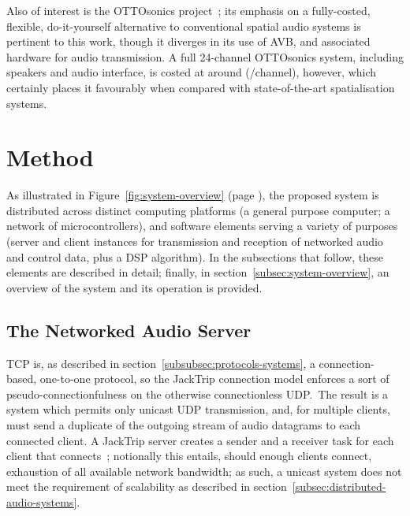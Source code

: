 \documentclass[utf8]{FrontiersinHarvard}
\newcommand{\figref}[1]{Figure~\ref{#1}}
\newcommand{\secref}[1]{section~\ref{#1}}
\begin{document}
    Also of interest is the OTTOsonics
    project~\citep{mitterhuber_ottosonics_2022};
    its emphasis on a fully-costed, flexible, do-it-yourself alternative to
    conventional spatial audio systems is pertinent to this work, though it
    diverges in its use of AVB, and associated hardware for audio transmission.
    A full 24-channel OTTOsonics system, including speakers and audio interface,
    is costed at around  (/channel), however,
    which certainly places it favourably when compared with state-of-the-art
    spatialisation systems.

    \section{Method}\label{sec:method}

    As illustrated in \figref{fig:system-overview}
    (page \pageref{fig:system-overview}), the proposed system is distributed
    across distinct computing platforms (a general purpose computer; a network
    of microcontrollers), and software elements serving a variety of purposes
    (server and client instances for transmission and reception of networked
    audio and control data, plus a DSP algorithm).
    In the subsections that follow, these elements are described in detail;
    finally, in \secref{subsec:system-overview}, an overview of the system and
    its operation is provided.

    \subsection{The Networked Audio Server}\label{subsec:the-networked-audio-server}

    TCP is, as described in \secref{subsubsec:protocols-systems}, a
    connection-based, one-to-one protocol, so the JackTrip connection model enforces
    a sort of pseudo-connectionfulness on the otherwise connectionless UDP.\
    The result is a system which permits only unicast UDP transmission, and, for
    multiple clients, must send a duplicate of the outgoing stream of audio
    datagrams to each connected client.
    A JackTrip server creates a sender and a receiver task for each client that
    connects~\citep{caceres_jacktrip_2010};
    notionally this entails, should enough clients connect, exhaustion of all
    available network bandwidth;
    as such, a unicast system does not meet the requirement of scalability as
    described in \secref{subsec:distributed-audio-systems}.
\end{document}
